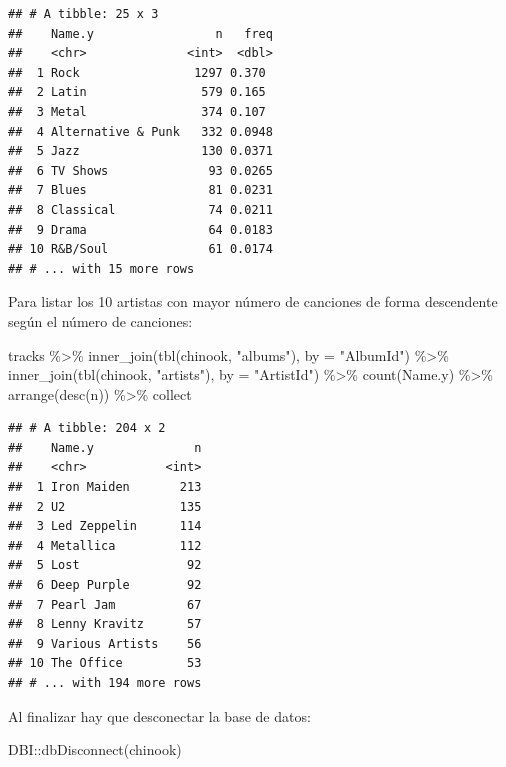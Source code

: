 \documentclass[
]{book}
\newenvironment{Shaded}{\begin{snugshade}}{\end{snugshade}}
\newcommand{\AttributeTok}[1]{\textcolor[rgb]{0.77,0.63,0.00}{#1}}
\newcommand{\FunctionTok}[1]{\textcolor[rgb]{0.00,0.00,0.00}{#1}}
\newcommand{\NormalTok}[1]{#1}
\newcommand{\SpecialCharTok}[1]{\textcolor[rgb]{0.00,0.00,0.00}{#1}}
\newcommand{\StringTok}[1]{\textcolor[rgb]{0.31,0.60,0.02}{#1}}
\theoremstyle{break}
\theoremstyle{nonumberplain}
\begin{document}
\begin{verbatim}
## # A tibble: 25 x 3
##    Name.y                 n   freq
##    <chr>              <int>  <dbl>
##  1 Rock                1297 0.370 
##  2 Latin                579 0.165 
##  3 Metal                374 0.107 
##  4 Alternative & Punk   332 0.0948
##  5 Jazz                 130 0.0371
##  6 TV Shows              93 0.0265
##  7 Blues                 81 0.0231
##  8 Classical             74 0.0211
##  9 Drama                 64 0.0183
## 10 R&B/Soul              61 0.0174
## # ... with 15 more rows
\end{verbatim}

Para listar los 10 artistas con mayor número de canciones de forma descendente según el número de canciones:

\begin{Shaded}
\begin{Highlighting}[]
\NormalTok{tracks }\SpecialCharTok{\%\textgreater{}\%} \FunctionTok{inner\_join}\NormalTok{(}\FunctionTok{tbl}\NormalTok{(chinook, }\StringTok{"albums"}\NormalTok{), }\AttributeTok{by =} \StringTok{"AlbumId"}\NormalTok{) }\SpecialCharTok{\%\textgreater{}\%} 
    \FunctionTok{inner\_join}\NormalTok{(}\FunctionTok{tbl}\NormalTok{(chinook, }\StringTok{"artists"}\NormalTok{), }\AttributeTok{by =} \StringTok{"ArtistId"}\NormalTok{) }\SpecialCharTok{\%\textgreater{}\%} 
    \FunctionTok{count}\NormalTok{(Name.y) }\SpecialCharTok{\%\textgreater{}\%} \FunctionTok{arrange}\NormalTok{(}\FunctionTok{desc}\NormalTok{(n)) }\SpecialCharTok{\%\textgreater{}\%}\NormalTok{ collect}
\end{Highlighting}
\end{Shaded}

\begin{verbatim}
## # A tibble: 204 x 2
##    Name.y              n
##    <chr>           <int>
##  1 Iron Maiden       213
##  2 U2                135
##  3 Led Zeppelin      114
##  4 Metallica         112
##  5 Lost               92
##  6 Deep Purple        92
##  7 Pearl Jam          67
##  8 Lenny Kravitz      57
##  9 Various Artists    56
## 10 The Office         53
## # ... with 194 more rows
\end{verbatim}

Al finalizar hay que desconectar la base de datos:

\begin{Shaded}
\begin{Highlighting}[]
\NormalTok{DBI}\SpecialCharTok{::}\FunctionTok{dbDisconnect}\NormalTok{(chinook)            }
\end{Highlighting}
\end{Shaded}
\end{document}
